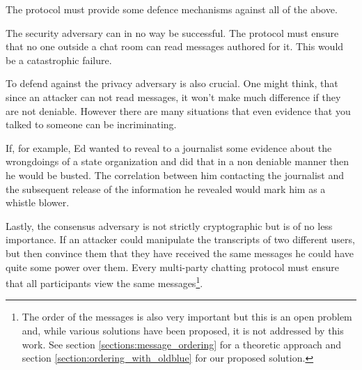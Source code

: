 The protocol must provide some defence mechanisms against all of the above.

The security adversary \secadv can in no way be successful.
The protocol must ensure that no one outside a chat room can read messages authored for it.
This would be a catastrophic failure.

To defend against the privacy adversary \privadv is also crucial.
One might think, that since an attacker can not read messages, it won't make much difference if they are not deniable.
However there are many situations that even evidence that you talked to someone can be incriminating.

If, for example, Ed wanted to reveal to a journalist some evidence about the wrongdoings of a state organization and did that in a non deniable manner then he would be busted.
The correlation between him contacting the journalist and the subsequent release of the information he revealed would mark him as a whistle blower.

Lastly, the consensus adversary \conadv is not strictly cryptographic but is of no less importance.
If an attacker could manipulate the transcripts of two different users, but then convince them that they have received the same messages he could have quite some power over them.
Every multi-party chatting protocol must ensure that all participants view the same messages\footnote{The order of the messages is also very important but this is an open problem and, while various solutions have been proposed, it is not addressed by this work. See section \ref{sections:message_ordering} for a theoretic approach and section \ref{section:ordering_with_oldblue} for our proposed solution.}.
